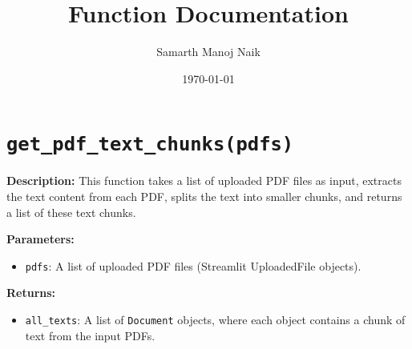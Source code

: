 \documentclass{article}
\title{Function Documentation}
\author{Samarth Manoj Naik}
\date{\today}
\begin{document}
\maketitle

\section*{\texttt{get\_pdf\_text\_chunks(pdfs)}}

\textbf{Description:} This function takes a list of uploaded PDF files as input, extracts the text content from each PDF, splits the text into smaller chunks, and returns a list of these text chunks.

\textbf{Parameters:}
\begin{itemize}
    \item \texttt{pdfs}: A list of uploaded PDF files (Streamlit UploadedFile objects).
\end{itemize}

\textbf{Returns:}
\begin{itemize}
    \item \texttt{all\_texts}: A list of \texttt{Document} objects, where each object contains a chunk of text from the input PDFs.
\end{itemize}
\end{document}
